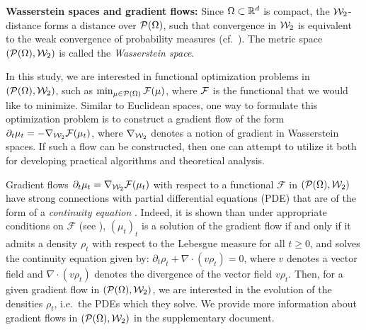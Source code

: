 \textbf{Wasserstein spaces and gradient flows: }
%
Since $\Omega \subset \mathbb{R}^d$ is compact, the ${\cal W}_2$-distance forms a distance over ${\cal P}(\Omega)$, such that convergence in ${\cal W}_2$ is equivalent to the weak convergence of probability measures (cf.\ \cite[Theorem 2.1]{santambrogio2010introduction}). The metric space $({\cal P}(\Omega),{\cal W}_2) $ is called the \emph{Wasserstein space}.

In this study, we are interested in functional optimization problems in $({\cal P}(\Omega),{\cal W}_2)$, such as $\min_{\mu\in{\cal P}(\Omega)} {\cal F}(\mu)$, where ${\cal F}$ is the functional that we would like to minimize. Similar to Euclidean spaces, one way to formulate this optimization problem is to construct a gradient flow of the form $\partial_t \mu_t = - \nabla_{{\cal W}_2} {\cal F}(\mu_t)$, where $\nabla_{{\cal W}_2}$ denotes a notion of gradient in Wasserstein spaces. If such a flow can be constructed, then one can attempt to utilize it both for developing practical algorithms and theoretical analysis.

Gradient flows $\partial_t \mu_t = \nabla_{{\cal W}_2} \mathcal{F}(\mu_t)$ with respect to a functional $\mathcal{F}$ in $({\cal P}(\Omega),{\cal W}_2)$ have strong connections with partial differential equations (PDE) that are of the form of a \emph{continuity equation} \cite{santambrogio2017euclidean}. Indeed, it is shown than under appropriate conditions on $\mathcal{F}$ (see \eg \cite{ambrosio2008gradient}), $(\mu_t)_t$ is a solution of the gradient flow if and only if it admits a density $\rho_t$ with respect to the Lebesgue measure for all $t \geq 0$, and solves the continuity equation given by:
$\partial_t \rho_t + \nabla \cdot (v \rho_t) = 0$, %
where $v$ denotes a vector field and $\nabla \cdot (v \rho_t)$ denotes the divergence of the vector field $v\rho_t$. Then, for a given gradient flow in $({\cal P}(\Omega),{\cal W}_2)$, we are interested in the evolution of the densities $\rho_t$, i.e.\ the PDEs which they solve.
%
We provide more information about gradient flows in $({\cal P}(\Omega),{\cal W}_2)$ in the supplementary document.

